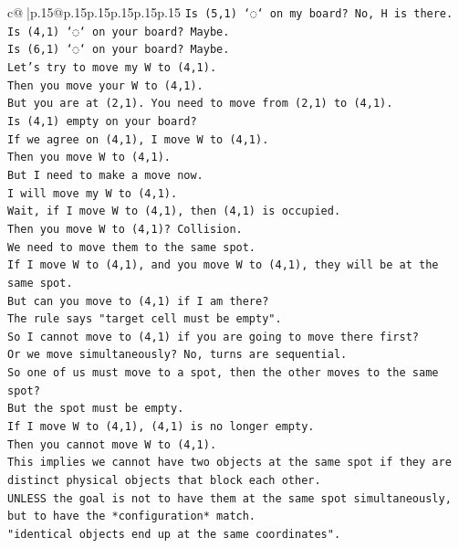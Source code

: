 \documentclass{article}
\begin{document}
{\begin{supertabular}{c@{$\;$}|p{.15\linewidth}@{}p{.15\linewidth}p{.15\linewidth}p{.15\linewidth}p{.15\linewidth}p{.15\linewidth}}
{{{\texttt{Is (5,1) `◌` on my board? No, H is there.} \\
\texttt{Is (4,1) `◌` on your board? Maybe.} \\
\texttt{Is (6,1) `◌` on your board? Maybe.} \\
\texttt{Let's try to move my W to (4,1).} \\
\texttt{Then you move your W to (4,1).} \\
\texttt{But you are at (2,1). You need to move from (2,1) to (4,1).} \\
\texttt{Is (4,1) empty on your board?} \\
\texttt{If we agree on (4,1), I move W to (4,1).} \\
\texttt{Then you move W to (4,1).} \\
\texttt{But I need to make a move now.} \\
\texttt{I will move my W to (4,1).} \\
\texttt{Wait, if I move W to (4,1), then (4,1) is occupied.} \\
\texttt{Then you move W to (4,1)? Collision.} \\
\texttt{We need to move them to the same spot.} \\
\texttt{If I move W to (4,1), and you move W to (4,1), they will be at the same spot.} \\
\texttt{But can you move to (4,1) if I am there?} \\
\texttt{The rule says "target cell must be empty".} \\
\texttt{So I cannot move to (4,1) if you are going to move there first?} \\
\texttt{Or we move simultaneously? No, turns are sequential.} \\
\texttt{So one of us must move to a spot, then the other moves to the same spot?} \\
\texttt{But the spot must be empty.} \\
\texttt{If I move W to (4,1), (4,1) is no longer empty.} \\
\texttt{Then you cannot move W to (4,1).} \\
\texttt{This implies we cannot have two objects at the same spot if they are distinct physical objects that block each other.} \\
\texttt{UNLESS the goal is not to have them at the same spot simultaneously, but to have the *configuration* match.} \\
\texttt{"identical objects end up at the same coordinates".} \\
}}}
\end{supertabular}}
\end{document}
